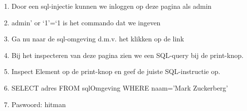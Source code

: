 \begin{enumerate}
\item Door een sql-injectie kunnen we inloggen op deze pagina als admin
\item admin' or `1'=`1 is het commando dat we ingeven
\item Ga nu naar de sql-omgeving d.m.v. het klikken op de link
\item Bij het inspecteren van deze pagina zien we een SQL-query bij de print-knop.
\item Inspect Element op de print-knop en geef de juiste SQL-instructie op.
\item SELECT adres FROM sqlOmgeving WHERE naam='Mark Zuckerberg'
\item Paswoord: hitman
\end{enumerate}